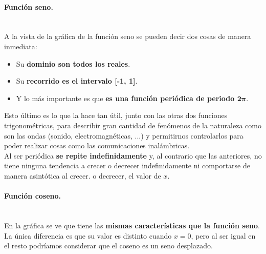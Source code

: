 \documentclass[a4paper,11pt,answers]{exam}
\begin{document}
\paragraph{Función seno.}\mbox{}\\
A la vista de la gráfica de la función seno se pueden decir dos cosas de manera inmediata:
\begin{itemize}
	\item Su \textbf{dominio son todos los reales}.
	\item Su \textbf{recorrido es el intervalo [-1, 1]}.
	\item Y lo más importante es que \textbf{es una función periódica de periodo $\boldsymbol{2\pi}$}.
\end{itemize}
Esto último es lo que la hace tan útil, junto con las otras dos funciones trigonométricas, para describir gran cantidad de fenómenos de la naturaleza como son las ondas (sonido, electromagnéticas, ...) y permitirnos controlarlos para poder realizar cosas como las comunicaciones inalámbricas.\\

Al ser periódica \textbf{se repite indefinidamente} y, al contrario que las anteriores, no tiene ninguna tendencia a crecer o decrecer indefinidamente ni comportarse de manera asintótica al crecer. o decrecer, el valor de $x$.\\

\paragraph{Función coseno.}\mbox{}\\
En la gráfica se ve que tiene las \textbf{mismas características que la función seno}. La única diferencia es que su valor es distinto cuando $x=0$, pero al ser igual en el resto podríamos considerar que el coseno es un seno desplazado.\\
\end{document}
